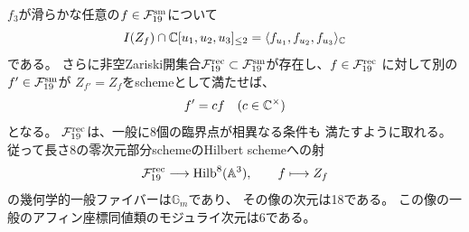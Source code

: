 \begin{theorem}[八点の臨界点schemeによる一般復元]
\label{thm:r13-eight-reconstruction}
$f_3$が滑らかな任意の$f\in\mathcal F_{19}^{\rm sm}$について
\begin{equation}\label{eq:critical-quadrics}
 I(Z_f)\cap\mathbb C[u_1,u_2,u_3]_{\le2}
 =\langle f_{u_1},f_{u_2},f_{u_3}\rangle_\mathbb C
\end{equation}
である。
さらに非空Zariski開集合$\mathcal F_{19}^{\rm rec}
\subset\mathcal F_{19}^{\rm sm}$が存在し、$f\in\mathcal F_{19}^{\rm rec}$
に対して別の$f'\in\mathcal F_{19}^{\rm sm}$が
$Z_{f'}=Z_f$をschemeとして満たせば、
\[
 f'=c f\quad(c\in\mathbb C^\times)
\]
となる。
$\mathcal F_{19}^{\rm rec}$は、一般に8個の臨界点が相異なる条件も
満たすように取れる。
従って長さ8の零次元部分schemeのHilbert schemeへの射
\[
 \mathcal F_{19}^{\rm rec}\longrightarrow
       \operatorname{Hilb}^8(\mathbb A^3),\qquad
 f\longmapsto Z_f
\]
の幾何学的一般ファイバーは$\mathbb G_m$であり、
その像の次元は18である。
この像の一般のアフィン座標同値類のモジュライ次元は6である。
\end{theorem}
